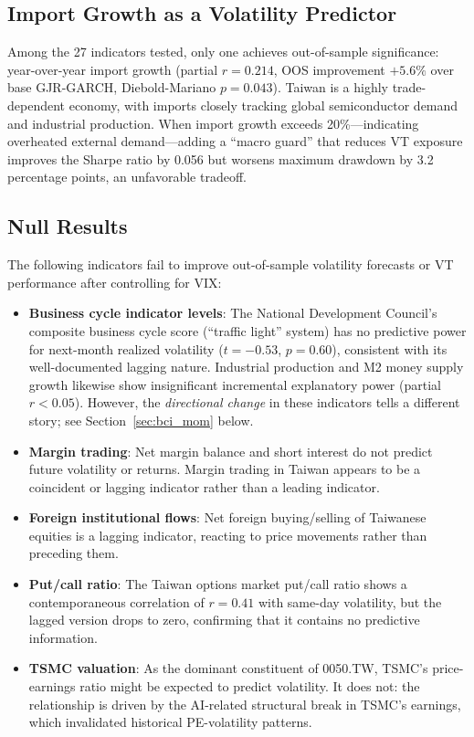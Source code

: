 \subsection{Import Growth as a Volatility Predictor}

Among the 27 indicators tested, only one achieves out-of-sample significance: year-over-year import growth (partial $r = 0.214$, OOS improvement $+5.6\%$ over base GJR-GARCH, Diebold-Mariano $p = 0.043$). Taiwan is a highly trade-dependent economy, with imports closely tracking global semiconductor demand and industrial production. When import growth exceeds 20\%---indicating overheated external demand---adding a ``macro guard'' that reduces VT exposure improves the Sharpe ratio by 0.056 but worsens maximum drawdown by 3.2 percentage points, an unfavorable tradeoff.

\subsection{Null Results}

The following indicators fail to improve out-of-sample volatility forecasts or VT performance after controlling for VIX:

\begin{itemize}
    \item \textbf{Business cycle indicator levels}: The National Development Council's composite business cycle score (``traffic light'' system) has no predictive power for next-month realized volatility ($t = -0.53$, $p = 0.60$), consistent with its well-documented lagging nature. Industrial production and M2 money supply growth likewise show insignificant incremental explanatory power (partial $r < 0.05$). However, the \textit{directional change} in these indicators tells a different story; see Section~\ref{sec:bci_mom} below.
    \item \textbf{Margin trading}: Net margin balance and short interest do not predict future volatility or returns. Margin trading in Taiwan appears to be a coincident or lagging indicator rather than a leading indicator.
    \item \textbf{Foreign institutional flows}: Net foreign buying/selling of Taiwanese equities is a lagging indicator, reacting to price movements rather than preceding them.
    \item \textbf{Put/call ratio}: The Taiwan options market put/call ratio shows a contemporaneous correlation of $r = 0.41$ with same-day volatility, but the lagged version drops to zero, confirming that it contains no predictive information.
    \item \textbf{TSMC valuation}: As the dominant constituent of 0050.TW, TSMC's price-earnings ratio might be expected to predict volatility. It does not: the relationship is driven by the AI-related structural break in TSMC's earnings, which invalidated historical PE-volatility patterns.
\end{itemize}

